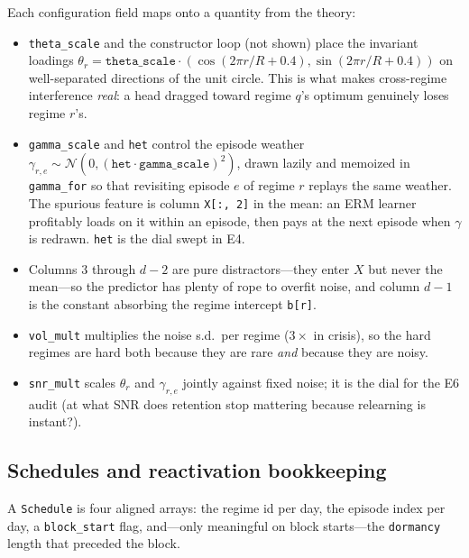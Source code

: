 \documentclass[11pt,a4paper]{article}
\theoremstyle{definition}
\theoremstyle{plain}
\begin{document}
Each configuration field maps onto a quantity from the theory:
\begin{itemize}
  \item \texttt{theta\_scale} and the constructor loop (not shown) place the
        invariant loadings $\theta_r = \texttt{theta\_scale} \cdot
        (\cos(2\pi r/R + 0.4), \sin(2\pi r/R + 0.4))$ on well-separated
        directions of the unit circle. This is what makes cross-regime
        interference \emph{real}: a head dragged toward regime $q$'s optimum
        genuinely loses regime $r$'s.
  \item \texttt{gamma\_scale} and \texttt{het} control the episode weather
        $\gamma_{r,e} \sim \mathcal{N}(0, (\texttt{het} \cdot
        \texttt{gamma\_scale})^2)$, drawn lazily and memoized in
        \texttt{gamma\_for} so that revisiting episode $e$ of regime $r$
        replays the same weather. The spurious feature is column
        \texttt{X[:, 2]} in the mean: an ERM learner profitably loads on it
        within an episode, then pays at the next episode when $\gamma$ is
        redrawn. \texttt{het} is the dial swept in E4.
  \item Columns $3$ through $d-2$ are pure distractors---they enter $X$ but
        never the mean---so the predictor has plenty of rope to overfit
        noise, and column $d-1$ is the constant absorbing the regime
        intercept \texttt{b[r]}.
  \item \texttt{vol\_mult} multiplies the noise s.d.\ per regime
        ($3{\times}$ in crisis), so the hard regimes are hard both because
        they are rare \emph{and} because they are noisy.
  \item \texttt{snr\_mult} scales $\theta_r$ and $\gamma_{r,e}$ jointly
        against fixed noise; it is the dial for the E6 audit (at what SNR
        does retention stop mattering because relearning is instant?).
\end{itemize}

\subsection{Schedules and reactivation bookkeeping}
\label{sec:dd6-schedules}

A \texttt{Schedule} is four aligned arrays: the regime id per day, the
episode index per day, a \texttt{block\_start} flag, and---only meaningful
on block starts---the \texttt{dormancy} length that preceded the block.
\end{document}
